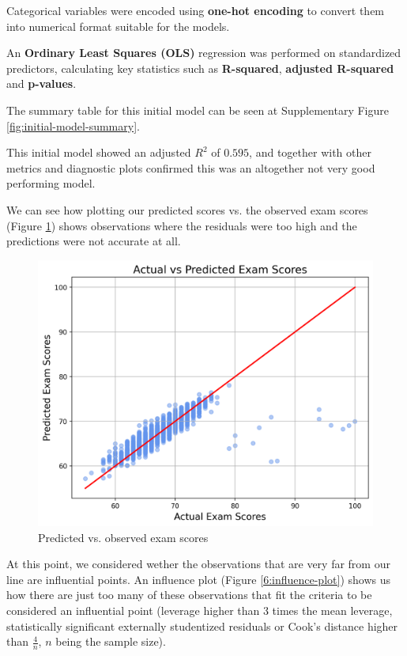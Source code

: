 \documentclass[twocolumn]{article} %
\begin{document}
Categorical variables were encoded using \textbf{one-hot encoding} to convert them into numerical format suitable for the models.

An \textbf{Ordinary Least Squares (OLS)} regression was performed on standardized predictors, calculating key statistics such as \textbf{R-squared}, \textbf{adjusted R-squared} and \textbf{p-values}.

The summary table for this initial model can be seen at Supplementary Figure \ref{fig:initial-model-summary}.

This initial model showed an adjusted $R^2$ of $0.595$, and together with other metrics and diagnostic plots confirmed this was an altogether not very good performing model.

We can see how plotting our predicted scores vs. the observed exam scores (Figure \ref{5:actual-vs-predicted}) shows observations where the residuals were too high and the predictions were not accurate at all.

\begin{figure}[h]
  \centering
  \includegraphics[width=\columnwidth]{5-actual-vs-predicted-scores.png}
  \caption{Predicted vs. observed exam scores}
  \label{5:actual-vs-predicted}
\end{figure}

At this point, we considered wether the observations that are very far from our line are influential points. An influence plot (Figure \ref{6:influence-plot}) shows us how there are just too many of these observations that fit the criteria to be considered an influential point (leverage higher than 3 times the mean leverage, statistically significant externally studentized residuals or Cook's distance higher than $\frac{4}{n}$, $n$ being the sample size).
\end{document}
